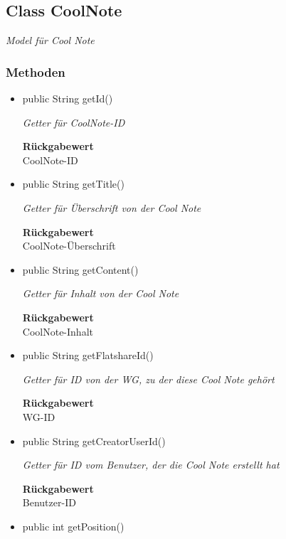 \documentclass[a4paper]{scrreprt}
\begin{document}
        \subsection{Class CoolNote}
        \textit{Model für Cool Note}
        \subsubsection{Methoden}
        \begin{itemize}
        	\item{public String getId()}
        	
        	\textit{Getter für CoolNote-ID}
        	
        	
        	
        	\textbf{Rückgabewert} \\
        	CoolNote-ID        \item{public String getTitle()}
        	
        	\textit{Getter für Überschrift von der Cool Note}
        	
        	
        	
        	\textbf{Rückgabewert} \\
        	CoolNote-Überschrift        \item{public String getContent()}
        	
        	\textit{Getter für Inhalt von der Cool Note}
        	
        	
        	
        	\textbf{Rückgabewert} \\
        	CoolNote-Inhalt        \item{public String getFlatshareId()}
        	
        	\textit{Getter für ID von der WG, zu der diese Cool Note gehört}
        	
        	
        	
        	\textbf{Rückgabewert} \\
        	WG-ID        \item{public String getCreatorUserId()}
        	
        	\textit{Getter für ID vom Benutzer, der die Cool Note erstellt hat}
        	
        	
        	
        	\textbf{Rückgabewert} \\
        	Benutzer-ID        \item{public int getPosition()}
        	

\end{itemize}
\end{document}
